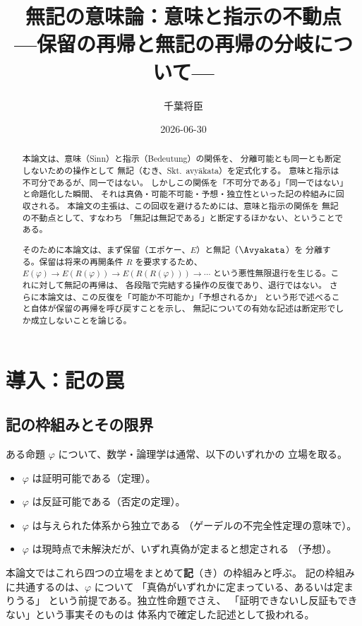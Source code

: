 \documentclass[11pt,a4paper,ja=standard,lualatex]{article}
\title{無記の意味論：意味と指示の不動点\\
---保留の再帰と無記の再帰の分岐について---}
\author{千葉将臣}
\date{2026-06-30}
\begin{document}
\maketitle

\begin{abstract}
本論文は、意味（Sinn）と指示（Bedeutung）の関係を、
分離可能とも同一とも断定しないための操作として
無記（むき、Skt.\ avy\=akata）を定式化する。
意味と指示は不可分であるが、同一ではない。
しかしこの関係を「不可分である」「同一ではない」と命題化した瞬間、
それは真偽・可能不可能・予想・独立性といった記の枠組みに回収される。
本論文の主張は、この回収を避けるためには、意味と指示の関係を
無記の不動点として、すなわち
「無記は無記である」と断定するほかない、ということである。

そのために本論文は、まず保留（エポケー、$E$）と無記（$\Avyakata$）を
分離する。保留は将来の再開条件 $R$ を要求するため、
$E(\varphi)\to E(R(\varphi))\to E(R(R(\varphi)))\to\cdots$
という悪性無限退行を生じる。これに対して無記の再帰は、
各段階で完結する操作の反復であり、退行ではない。
さらに本論文は、この反復を「可能か不可能か」「予想されるか」
という形で述べること自体が保留の再帰を呼び戻すことを示し、
無記についての有効な記述は断定形でしか成立しないことを論じる。
\end{abstract}

\tableofcontents

\section{導入：記の罠}

\subsection{記の枠組みとその限界}

ある命題 $\varphi$ について、数学・論理学は通常、以下のいずれかの
立場を取る。

\begin{itemize}
\item $\varphi$ は証明可能である（定理）。
\item $\varphi$ は反証可能である（否定の定理）。
\item $\varphi$ は与えられた体系から独立である
  （ゲーデルの不完全性定理の意味で）。
\item $\varphi$ は現時点で未解決だが、いずれ真偽が定まると想定される
  （予想）。
\end{itemize}

本論文ではこれら四つの立場をまとめて\textbf{記}（き）の枠組みと呼ぶ。
記の枠組みに共通するのは、$\varphi$ について
「真偽がいずれかに定まっている、あるいは定まりうる」
という前提である。独立性命題でさえ、
「証明できないし反証もできない」という事実そのものは
体系内で確定した記述として扱われる。
\end{document}
